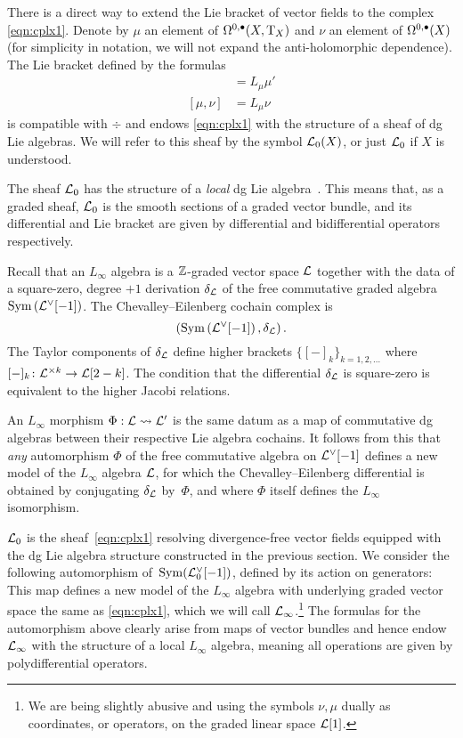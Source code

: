 There is a direct way to extend the Lie bracket of vector fields to the complex \eqref{eqn:cplx1}. 
Denote by $\mu$ an element of $\Omega^{0,\bullet}(X , {\rm T}_X)$ and $\nu$ an element of $\Omega^{0,\bullet}(X)$ (for simplicity in notation, we will not expand the anti-holomorphic dependence). 
The Lie bracket defined by the formulas
\begin{align*}
[\mu, \mu'] & = L_\mu \mu' \\
[\mu, \nu] & = L_\mu \nu 
\end{align*}
is compatible with $\div$ and endows \eqref{eqn:cplx1} with the structure of a sheaf of dg Lie algebras.
We will refer to this sheaf by the symbol $\mathcal L_0(X)$, or just $\mathcal L_0$ if $X$ is understood. 

The sheaf $\mathcal L_0$ has the structure of a {\em local} dg Lie algebra~\cite[\S 3.1.3]{CG2}.
This means that, as a graded sheaf, $\mathcal L_0$ is the smooth sections of a graded vector bundle, and its differential and Lie bracket are given by differential and bidifferential operators respectively.



Recall that an $L_\infty$ algebra is a $\mathbb Z$-graded vector space $\mathcal L$ together with the data of a square-zero, degree $+1$ derivation $\delta_\mathcal L$ of the free commutative graded algebra $\operatorname{Sym}\left(\mathcal L^\vee [-1] \right)$. 
The Chevalley--Eilenberg cochain complex is 
\[
\left(\operatorname{Sym}\left(\mathcal L^\vee [-1] \right), \delta_\mathcal L\right) .
\]
The Taylor components of $\delta_\mathcal L$ define higher brackets $\{[-]_k\}_{k=1,2,\ldots}$ where $[-]_k \colon \mathcal L^{\times k} \to \mathcal L[2-k]$. 
The condition that the differential $\delta_\mathcal L$ is square-zero is equivalent to the higher Jacobi relations.

An $L_\infty$ morphism $\Phi: \mathcal L \rightsquigarrow \mathcal L'$ is the same datum as a map of commutative dg algebras 
between their respective Lie algebra cochains. It follows from this that \emph{any} automorphism $\Phi$ of the free commutative algebra on $\mathcal L^\vee[-1]$ defines a new model of the $L_\infty$ algebra $\mathcal L$, for which the Chevalley--Eilenberg differential is obtained by conjugating $\delta_\mathcal L$ by~$\Phi$, and where $\Phi$ itself defines the $L_\infty$ isomorphism.

$\mathcal L_0$ is the sheaf~\eqref{eqn:cplx1} resolving divergence-free vector fields equipped with the dg Lie algebra structure constructed in the previous section.
We consider the following automorphism of~$\operatorname{Sym}(\mathcal L_0^\vee[-1])$, defined by its action on generators:
This map defines a new model of the $L_\infty$ algebra with underlying graded vector space the same as \eqref{eqn:cplx1}, which we will call $\mathcal L_\infty$.\footnote{We are being slightly abusive and using the symbols $\nu,\mu$ dually as coordinates, or operators, on the graded linear space $\mathcal L[1]$.}
The formulas for the automorphism above clearly arise from maps of vector bundles and hence endow $\mathcal L_\infty$ with the structure of a local $L_\infty$ algebra, meaning all operations are given by polydifferential operators.  

